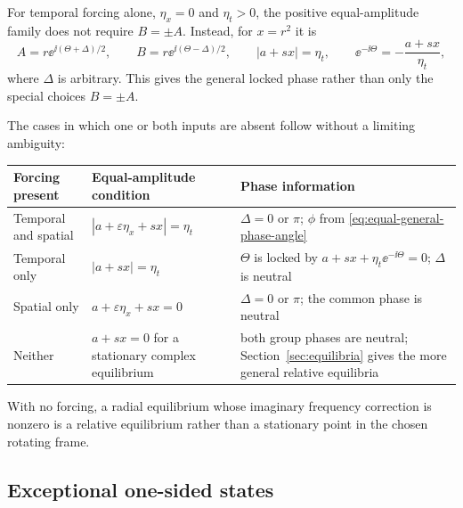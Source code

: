 For temporal forcing alone, $\eta_x=0$ and $\eta_t>0$, the positive
equal-amplitude family
does not require $B=\pm A$.  Instead, for $x=r^2$ it is
\begin{equation}
 A=r\ee^{\ii(\Theta+\Delta)/2},\qquad
 B=r\ee^{\ii(\Theta-\Delta)/2},\qquad
 |a+sx|=\eta_t,\qquad
 \ee^{-\ii\Theta}=-\frac{a+sx}{\eta_t},
 \label{eq:temporal-only-equal-family}
\end{equation}
where $\Delta$ is arbitrary.  This gives the general locked phase rather
than only the special choices $B=\pm A$.

The cases in which one or both inputs are absent follow without a limiting
ambiguity:
\begin{center}
\begin{tabular}{@{}L{0.18\textwidth}L{0.36\textwidth}L{0.34\textwidth}@{}}
\toprule
Forcing present & Equal-amplitude condition & Phase information\\
\midrule
Temporal and spatial &
$|a+\varepsilon\eta_x+sx|=\eta_t$ &
$\Delta=0$ or $\pi$; $\phi$ from
\eqref{eq:equal-general-phase-angle}\\
Temporal only &
$|a+sx|=\eta_t$ &
$\Theta$ is locked by
$a+sx+\eta_t\ee^{-\ii\Theta}=0$; $\Delta$ is neutral\\
Spatial only &
$a+\varepsilon\eta_x+sx=0$ &
$\Delta=0$ or $\pi$; the common phase is neutral\\
Neither &
$a+sx=0$ for a stationary complex equilibrium &
both group phases are neutral; Section~\ref{sec:equilibria} gives the more
general relative equilibria\\
\bottomrule
\end{tabular}
\end{center}
With no forcing, a radial equilibrium whose imaginary frequency correction
is nonzero is a relative equilibrium rather than a stationary point in the
chosen rotating frame.

\subsection{Exceptional one-sided states}

